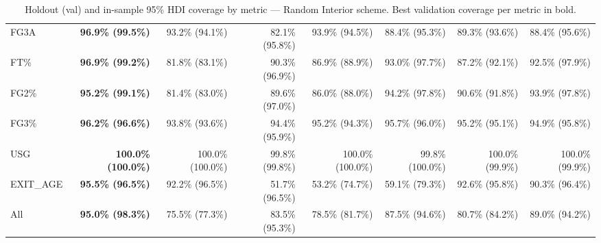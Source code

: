\documentclass{article}
\begin{document}
\begin{table}[H]
{\begin{tabular}{lrrrrrrr}
FG3A & \textbf{96.9\% (99.5\%)} & 93.2\% (94.1\%) & 82.1\% (95.8\%) & 93.9\% (94.5\%) & 88.4\% (95.3\%) & 89.3\% (93.6\%) & 88.4\% (95.6\%) \\
FT\% & \textbf{96.9\% (99.2\%)} & 81.8\% (83.1\%) & 90.3\% (96.9\%) & 86.9\% (88.9\%) & 93.0\% (97.7\%) & 87.2\% (92.1\%) & 92.5\% (97.9\%) \\
FG2\% & \textbf{95.2\% (99.1\%)} & 81.4\% (83.0\%) & 89.6\% (97.0\%) & 86.0\% (88.0\%) & 94.2\% (97.8\%) & 90.6\% (91.8\%) & 93.9\% (97.8\%) \\
FG3\% & \textbf{96.2\% (96.6\%)} & 93.8\% (93.6\%) & 94.4\% (95.9\%) & 95.2\% (94.3\%) & 95.7\% (96.0\%) & 95.2\% (95.1\%) & 94.9\% (95.8\%) \\
USG & \textbf{100.0\% (100.0\%)} & 100.0\% (100.0\%) & 99.8\% (99.8\%) & 100.0\% (100.0\%) & 99.8\% (100.0\%) & 100.0\% (99.9\%) & 100.0\% (99.9\%) \\
EXIT\_AGE & \textbf{95.5\% (96.5\%)} & 92.2\% (96.5\%) & 51.7\% (96.5\%) & 53.2\% (74.7\%) & 59.1\% (79.3\%) & 92.6\% (95.8\%) & 90.3\% (96.4\%) \\
\midrule
All & \textbf{95.0\% (98.3\%)} & 75.5\% (77.3\%) & 83.5\% (95.3\%) & 78.5\% (81.7\%) & 87.5\% (94.6\%) & 80.7\% (84.2\%) & 89.0\% (94.2\%) \\
\bottomrule
\end{tabular}
}
\caption{Holdout (val) and in-sample 95\% HDI coverage by metric --- Random Interior scheme. Best validation coverage per metric in bold.}
\label{tab:hdi_coverage_random_interior}
\end{table}
\end{document}

